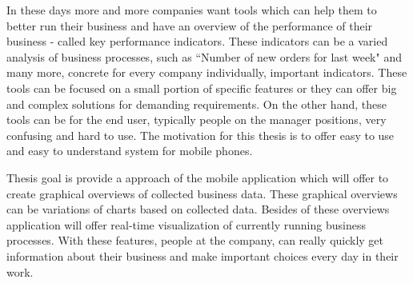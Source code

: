 In these days more and more companies want tools which can help them to better run their business and have an overview of the performance of their business - called key performance indicators. These indicators can be a varied analysis of business processes, such as ``Number of new orders for last week" and many more, concrete for every company individually, important indicators. These tools can be focused on a small portion of specific features or they can offer big and complex solutions for demanding requirements. On the other hand, these tools can be for the end user, typically people on the manager positions, very confusing and hard to use. The motivation for this thesis is to offer easy to use and easy to understand system for mobile phones.

Thesis goal is provide a approach of the mobile application which will offer to create graphical overviews of collected business data. These graphical overviews can be variations of charts based on collected data. Besides of these overviews application will offer real-time visualization of currently running business processes. With these features, people at the company, can really quickly get information about their business and make important choices every day in their work. 